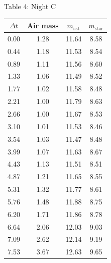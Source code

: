 \begin{center}
Table 4: Night C

\begin{tabular}{c|c|c|c}
$\Delta t$ & Air mass & $m_{\mathrm{ast}}$ & $m_{\mathrm{star}}$ \\
\hline
0.00 & 1.28 & 11.64 & 8.58 \\
0.44 & 1.18 & 11.53 & 8.54 \\
0.89 & 1.11 & 11.56 & 8.60 \\
1.33 & 1.06 & 11.49 & 8.52 \\
1.77 & 1.02 & 11.58 & 8.48 \\
2.21 & 1.00 & 11.79 & 8.63 \\
2.66 & 1.00 & 11.67 & 8.53 \\
3.10 & 1.01 & 11.53 & 8.46 \\
3.54 & 1.03 & 11.47 & 8.48 \\
3.99 & 1.07 & 11.63 & 8.67 \\
4.43 & 1.13 & 11.51 & 8.51 \\
4.87 & 1.21 & 11.65 & 8.55 \\
5.31 & 1.32 & 11.77 & 8.61 \\
5.76 & 1.48 & 11.88 & 8.75 \\
6.20 & 1.71 & 11.86 & 8.78 \\
6.64 & 2.06 & 12.03 & 9.03 \\
7.09 & 2.62 & 12.14 & 9.19 \\
7.53 & 3.67 & 12.63 & 9.65 \\
\end{tabular}
\end{center}

